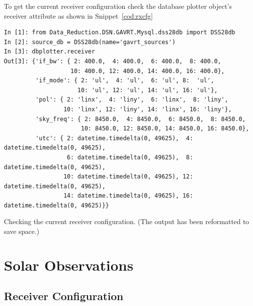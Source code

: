 \documentclass[letterpaper,11pt]{report}
\begin{document}
To get the current receiver configuration check the database plotter object's
{\ttfamily receiver} attribute as shown in Snippet~\ref{cod:rxcfg}
\begin{code}[h!tb]
    \begin{center}
        {\scriptsize \begin{verbatim}
In [1]: from Data_Reduction.DSN.GAVRT.Mysql.dss28db import DSS28db
In [2]: source_db = DSS28db(name='gavrt_sources')
In [3]: dbplotter.receiver
Out[3]: {'if_bw': { 2: 400.0,  4: 400.0,  6: 400.0,  8: 400.0,
                   10: 400.0, 12: 400.0, 14: 400.0, 16: 400.0},
         'if_mode': { 2: 'ul',  4: 'ul',  6: 'ul', 8:  'ul',
                     10: 'ul', 12: 'ul', 14: 'ul', 16: 'ul'},
         'pol': { 2: 'linx',  4: 'liny',  6: 'linx',  8: 'liny',
                 10: 'linx', 12: 'liny', 14: 'linx', 16: 'liny'},
         'sky_freq': { 2: 8450.0,  4: 8450.0,  6: 8450.0,  8: 8450.0,
                      10: 8450.0, 12: 8450.0, 14: 8450.0, 16: 8450.0},
         'utc': { 2: datetime.timedelta(0, 49625),  4: datetime.timedelta(0, 49625),
                  6: datetime.timedelta(0, 49625),  8: datetime.timedelta(0, 49625),
                 10: datetime.timedelta(0, 49625), 12: datetime.timedelta(0, 49625),
                 14: datetime.timedelta(0, 49625), 16: datetime.timedelta(0, 49625)}}\end{verbatim}
}\caption{\label{cod:rxcfg}Checking the current receiver configuration. (The
output has been reformatted to save space.)}
\end{center}
\end{code}


\chapter{Solar Observations}

\section{Receiver Configuration}
\end{document}
